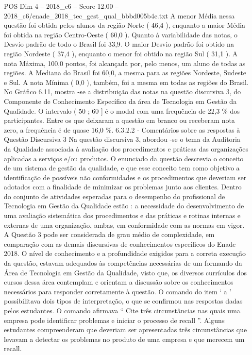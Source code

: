 \begin{textsample}{POS Dim 4 – 2018\_c6 – Score 12.00 – 2018\_c6/enade\_2018\_tec\_gest\_qual\_bbbd005b4c.txt}
A menor Média nessa questão foi obtida pelos alunos da região Norte ( 46,4 ), enquanto a maior Média foi obtida na região Centro-Oeste ( 60,0 ).
Quanto à variabilidade das notas, o Desvio padrão de todo o Brasil foi 33,9.
O maior Desvio padrão foi obtido na região Nordeste ( 37,4 ), enquanto o menor foi obtido na região Sul ( 31,1 ).
A nota Máxima, 100,0 pontos, foi alcançada por, pelo menos, um aluno de todas as regiões.
A Mediana do Brasil foi 60,0, a mesma para as regiões Nordeste, Sudeste e Sul.
A nota Mínima ( 0,0 ), também, foi a mesma em todas as regiões do Brasil.
No Gráfico 6.11, mostra -se a distribuição das notas na questão discursiva 3, do Componente de Conhecimento Específico da área de Tecnologia em Gestão da Qualidade.
O intervalo ( 50 ; 60 ] é o modal com uma frequência de 22,3 \% dos participantes.
Entre os que deixaram a questão em branco ou receberam nota zero, a frequência é de quase 16,0 \%. 6.3.2.2 - Comentários sobre as respostas à Questão Discursiva 3 Na questão discursiva 3, abordou -se o tema da Auditoria da Qualidade associada à avaliação dos procedimentos e práticas das organizações aplicadas a serviços e/ou produtos.
O enunciado da questão descrevia o conceito de um sistema de gestão da qualidade, e que esse conceito tem como objetivo a identificação de possíveis não conformidades e os procedimentos que deveriam ser adotados com a finalidade de minimizar os problemas junto aos clientes.
Dentro do conjunto de atividades esperadas para o desempenho do profissional de Tecnologia em Gestão da Qualidade estão : a necessidade do desenvolvimento de uma avaliação sistemática dos procedimentos e das práticas e rotinas internas e externas de uma organização, ambas, em conformidade com as normas em vigor.
A Questão 3 pode ser considerada de grau médio de complexidade, em comparação com as demais discursivas de conhecimentos específicos do Enade 2018.
O nível de conhecimento e a profundidade exigidos para a correta execução da questão, estavam adequados às competências necessárias de um formando da Área de Tecnologia em Gestão da Qualidade, visto que, os diversos currículos dos cursos dessa área contemplam e orientam a discussão sobre os conhecimentos necessários para responder corretamente à questão.
O comando do item ‘ a ’ possibilitava dois tipos de interpretação, o que se confirmou nas respostas dadas pelos estudantes.
O comando afirmava “ Cite três circunstâncias nas quais uma empresa pode identificar problemas e iniciar o processo de recall ”.
Alguns estudantes compreenderam que deveriam ser apresentadas três circunstâncias que levavam a detectar os problemas no produto de uma empresa e que merecem um recall.

\end{textsample}
